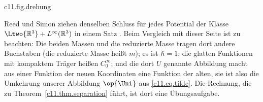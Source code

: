 \begin{fundament}
  \begin{tpcfigure}{c11.fig.drehung}
    \caption{Schritt 2 des Beweises für eine Raumrichtung, gezeichnet für $\massP : \massE = 3 : 1$. In der Ebene der skalierten Koordinaten $x_{\mathrm{e}}$, $x_{\mathrm{p}}$ ist $z$ die Koordinate längs des Einheitsvektors mit den Komponenten $\sqrt{\massP/\massTot}$ und $-\sqrt{\massE/\massTot}$. Dieser und die dazu senkrechte Richtung bilden ein gedrehtes Achsenkreuz; der Kreis ist der Einheitskreis.}
  \end{tpcfigure}

  Reed und Simon ziehen denselben Schluss für jedes Potential der Klasse
  $\Ltwo{\mathbb{R}^3} + L^{\infty}(\mathbb{R}^3)$ in einem Satz
  . Beim Vergleich mit dieser Seite ist zu beachten:
  Die beiden Massen und die reduzierte Masse tragen dort andere Buchstaben (die
  reduzierte Masse heißt $m$); es ist $\hbar = 1$; die glatten Funktionen mit kompaktem
  Träger heißen $C_0^{\infty}$; und die dort $U$ genannte Abbildung macht aus einer
  Funktion der neuen Koordinaten eine Funktion der alten, sie ist also die Umkehrung
  unserer Abbildung $\op{\Uni}$ aus \eqref{c11.eq.tilde}. Die Rechnung, die zu
  Theorem~\ref{c11.thm.separation} führt, ist dort eine Übungsaufgabe.
\end{fundament}

